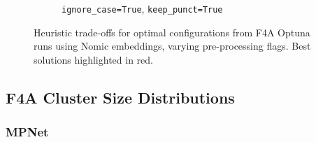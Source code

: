 \documentclass[10pt,oneside]{report}
\begin{document}
\begin{figure}[H]
\begin{subfigure}[b]{0.48\textwidth}
        \caption{\texttt{ignore\_case=True}, \texttt{keep\_punct=True}}
        \label{fig:nomic_tt_f4a_config} %
    \end{subfigure}
    \caption{Heuristic trade-offs for optimal configurations from F4A Optuna runs using Nomic embeddings, varying pre-processing flags. Best solutions highlighted in red.}
    \label{fig:nomic_f4a_config_appendix} %
\end{figure}

\subsection{F4A Cluster Size Distributions}\label{sec:f4a_whisker_appendix}

\subsubsection{MPNet}
\end{document}
